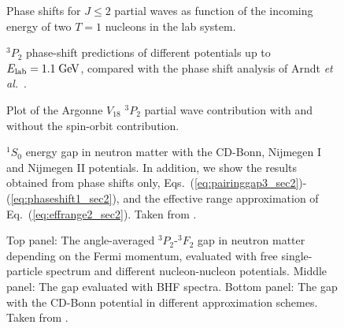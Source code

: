 \documentclass[rmp,preprint,aps,floatfix]{revtex4}
\begin{document}
\begin{figure}
\caption{Phase shifts for $J\leq 2$  partial waves as function of
         the incoming energy of two $T=1$ nucleons in the lab system.
         \label{fig:t1partialwaves}}
\end{figure} 

\begin{figure}
\caption{$^3P_2$ phase-shift predictions of different potentials
         up to $E_{\rm lab}=1.1\;{\rm GeV}$, compared with the
         phase shift analysis of Arndt {\em et al.}~\protect\cite{arndt97}.}
\label{fig:3p2phaseshift}
\end{figure}


\begin{figure}
\caption{Plot of the Argonne $V_{18}$ \cite{v18} 
$^3P_2$ partial wave contribution  
with and without the
spin-orbit contribution.
         \label{fig:tripletwaves}}
\end{figure} 


\begin{figure}
\caption{$^1S_0$ energy gap in neutron matter with the CD-Bonn, 
             Nijmegen I and Nijmegen II potentials. In addition, we 
             show the results obtained from phase shifts only, 
             Eqs.~(\ref{eq:pairinggap3_sec2})-(\ref{eq:phaseshift1_sec2}), 
             and the effective range approximation of 
             Eq.~(\ref{eq:effrange2_sec2}). Taken from \cite{eh98}.
             \label{fig:energygap_sec2}}
\end{figure}

\begin{figure}
\caption{Top panel: The angle-averaged $^3P_2$-$^3F_2$ gap in neutron matter
         depending on the Fermi momentum, evaluated with free 
         single-particle spectrum and different nucleon-nucleon potentials. 
         Middle panel: The gap evaluated with BHF spectra.
         Bottom panel: The gap with the CD-Bonn potential in different 
         approximation schemes. Taken from \cite{pair2}.\label{fig:gaps}}

\end{figure}
\end{document}

